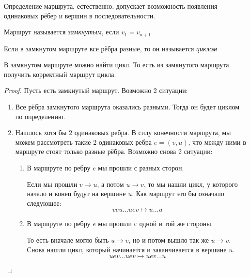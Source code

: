 \begin{multicols}{2}
    \begin{note}{}{}
      Определение маршрута, естественно, допускает возможность появления одинаковых рёбер и вершин в последовательности.
    \end{note}
    
    \begin{definition}{}{}
      Маршрут называется \textit{замкнутым}, если $v_1 = v_{n + 1}$
    \end{definition}
    
    \begin{definition}{}{}
      Если в замкнутом маршруте все рёбра разные, то он называется \textit{циклом}
    \end{definition}
    
    \begin{lemma}{}{}
      В замкнутом маршруте можно найти цикл. То есть из замкнутого маршрута получить корректный маршрут цикла.
    \end{lemma}
    
    \begin{proof}
      Пусть есть замкнутый маршрут. Возможно 2 ситуации:
      \begin{enumerate}
        \item Все рёбра замкнутого маршрута оказались разными. Тогда он будет циклом по определению.
        
        \item Нашлось хотя бы 2 одинаковых ребра. В силу конечности маршрута, мы можем рассмотреть такие 2 одинаковых ребра $e = (v, u)$, что между ними в маршруте стоят только разные рёбра. Возможно снова 2 ситуации:
        \begin{enumerate}
          \item В маршруте по ребру $e$ мы прошли с разных сторон.
          
          Если мы прошли $v \to u$, а потом $u \to v$, то мы нашли цикл, у которого начало и конец будут на вершине $u$. Как маршрут это бы означало следующее:
          \[
            veu \ldots uev \mapsto u \ldots u
          \]
          
          \item В маршруте по ребру $e$ мы прошли с одной и той же стороны.
          
          То есть вначале могло быть $u \to v$, но и потом вышло так же $u \to v$. Снова нашли цикл, который начинается и заканчивается в вершине $u$.
          \[
            uev \ldots uev \mapsto uev \ldots u
          \]
        \end{enumerate}
      \end{enumerate}
    \end{proof}
    

\end{multicols}
